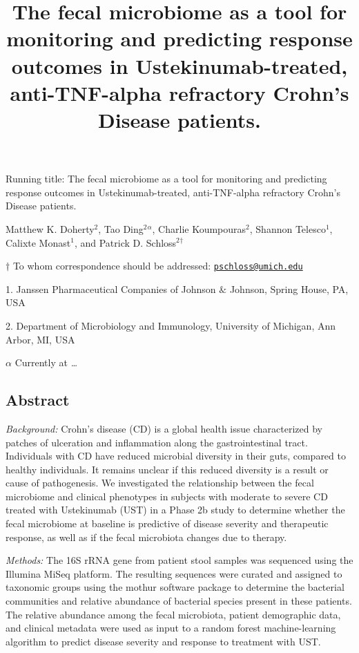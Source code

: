 \documentclass[11pt,]{article}
\title{The fecal microbiome as a tool for monitoring and predicting response
outcomes in Ustekinumab-treated, anti-TNF-alpha refractory Crohn's
Disease patients.}
\author{}
\date{}
\begin{document}
\maketitle

\vspace{35mm}

Running title: The fecal microbiome as a tool for monitoring and
predicting response outcomes in Ustekinumab-treated, anti-TNF-alpha
refractory Crohn's Disease patients.

\vspace{35mm} Matthew K. Doherty\({^2}\), Tao Ding\({^2}\)\({^\alpha}\),
Charlie Koumpouras\({^2}\), Shannon Telesco\({^1}\), Calixte
Monast\({^1}\), and Patrick D. Schloss\({^2}\)\({^\dagger}\)

\(\dagger\) To whom correspondence should be addressed:
\href{mailto:pschloss@umich.edu}{\nolinkurl{pschloss@umich.edu}}

1. Janssen Pharmaceutical Companies of Johnson \({\&}\) Johnson, Spring
House, PA, USA

2. Department of Microbiology and Immunology, University of Michigan,
Ann Arbor, MI, USA

\({\alpha}\) Currently at \emph{\ldots{}}

\newpage

\subsection{Abstract}\label{abstract}

\emph{Background:} Crohn's disease (CD) is a global health issue
characterized by patches of ulceration and inflammation along the
gastrointestinal tract. Individuals with CD have reduced microbial
diversity in their guts, compared to healthy individuals. It remains
unclear if this reduced diversity is a result or cause of pathogenesis.
We investigated the relationship between the fecal microbiome and
clinical phenotypes in subjects with moderate to severe CD treated with
Ustekinumab (UST) in a Phase 2b study to determine whether the fecal
microbiome at baseline is predictive of disease severity and therapeutic
response, as well as if the fecal microbiota changes due to therapy.

\emph{Methods:} The 16S rRNA gene from patient stool samples was
sequenced using the Illumina MiSeq platform. The resulting sequences
were curated and assigned to taxonomic groups using the mothur software
package to determine the bacterial communities and relative abundance of
bacterial species present in these patients. The relative abundance
among the fecal microbiota, patient demographic data, and clinical
metadata were used as input to a random forest machine-learning
algorithm to predict disease severity and response to treatment with
UST.
\end{document}
